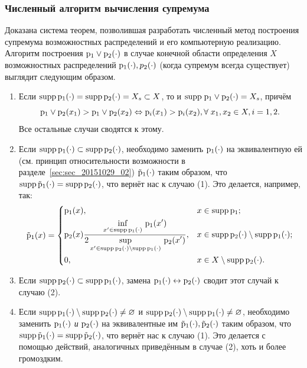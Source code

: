 \subsubsection{Численный алгоритм вычисления супремума}
\label{algo_sup_poss}

Доказана система теорем, позволившая разработать численный метод построения супремума возможностных распределений и его компьютерную реализацию. Алгоритм построения ${\mathrm{p}}_1 \vee{\mathrm{p}}_2(\cdot)$ в случае конечной области определения $X$ возможностных распределений ${\mathrm{p}}_1(\cdot), p_2(\cdot)$ (когда супремум всегда существует) выглядит следующим образом.
\begin{enumerate}
	\item 
		Если ${\mathrm{supp}}\,{\mathrm{p}}_1(\cdot) = {\mathrm{supp}}\,{\mathrm{p}}_2(\cdot) = X_s \subset X$, то и ${\mathrm{supp}} \; {\mathrm{p}}_1 \vee{\mathrm{p}}_2(\cdot) = X_s$, причём 
		\begin{equation*}
			{\mathrm{p}}_1 \vee{\mathrm{p}}_2(x_1) > {\mathrm{p}}_1 \vee{\mathrm{p}}_2(x_2) \Leftrightarrow {\mathrm{p}}_i(x_1) > {\mathrm{p}}_i(x_2), \forall\;x_1, x_2 \in X, i=1,2.
		\end{equation*}
		Все остальные случаи сводятся к этому.
	\item 
		Если ${\mathrm{supp}}\,{\mathrm{p}}_1(\cdot) \subset {\mathrm{supp}}\,{\mathrm{p}}_2(\cdot)$, необходимо заменить ${\mathrm{p}}_1(\cdot)$ на эквивалентную ей (см. принцип 		относительности возможности в разделе~\ref{sec:sec_20151029_02}) $\tilde {{\mathrm{p}}}_1(\cdot)$ таким образом, что ${\mathrm{supp}}\,\tilde {{\mathrm{p}}}_1(	\cdot) = {\mathrm{supp}}\,{\mathrm{p}}_2(\cdot)$, что вернёт нас к случаю (1). Это делается, например, так:
		\begin{equation*}
			\tilde {{\mathrm{p}}}_1(x) = \begin{dcases}
										{\mathrm{p}}_1(x), & x \in {\mathrm{supp}}\,{\mathrm{p}}_1;
										\\ {\mathrm{p}}_2(x)\frac{\displaystyle \inf_{ x' \in {\mathrm{supp}}\,{\mathrm{p}}_1(\cdot)}\, {\mathrm{p}}_1(x')}{\displaystyle 2 \sup_{ x' \in {\mathrm{supp}}\,{\mathrm{p}}_2(\cdot) \setminus {\mathrm{supp}}\,{\mathrm{p}}_1(\cdot)}\, {\mathrm{p}}_2(x')}, & x \in {\mathrm{supp}}\,{\mathrm{p}}_2(\cdot) \setminus {\mathrm{supp}}\,{\mathrm{p}}_1(\cdot);
										\\ 0, & x \in X \setminus {\mathrm{supp}}\,{\mathrm{p}}_2(\cdot).
										\end{dcases}			
		\end{equation*}
	\item Если ${\mathrm{supp}}\,{\mathrm{p}}_2(\cdot) \subset {\mathrm{supp}}\,{\mathrm{p}}_1(\cdot)$, замена ${\mathrm{p}}_1(\cdot) \leftrightarrow {\mathrm{p}}_2(\cdot)$ сводит этот случай к случаю (2).
	\item Если ${\mathrm{supp}}\,{\mathrm{p}}_1(\cdot) \setminus {\mathrm{supp}}\,{\mathrm{p}}_2(\cdot) \neq \varnothing$  и  ${\mathrm{supp}}\,{\mathrm{p}}_2(\cdot) \setminus {\mathrm{supp}}\,{\mathrm{p}}_1(\cdot) \neq \varnothing$, необходимо заменить ${\mathrm{p}}_1(\cdot)$ \emph{и} ${\mathrm{p}}_2(\cdot)$ на эквивалентные им $\tilde {{\mathrm{p}}}_1(\cdot), \tilde {{\mathrm{p}}}_2(\cdot)$ таким образом, что ${\mathrm{supp}}\,\tilde {{\mathrm{p}}}_1(	\cdot) = {\mathrm{supp}}\,\tilde {{\mathrm{p}}}_2(\cdot)$, что вернёт нас к случаю (1). Это делается с помощью действий, аналогичных приведённым в случае (2), хоть и более громоздким.	
\end{enumerate}

